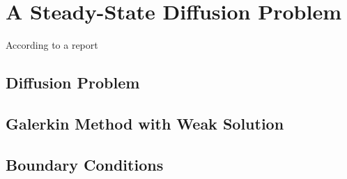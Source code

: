 \section {A Steady-State Diffusion Problem}
According to a report\cite{Karniadarkis}
\subsection {Diffusion Problem}
\subsection {Galerkin Method with Weak Solution}
\subsection {Boundary Conditions}
